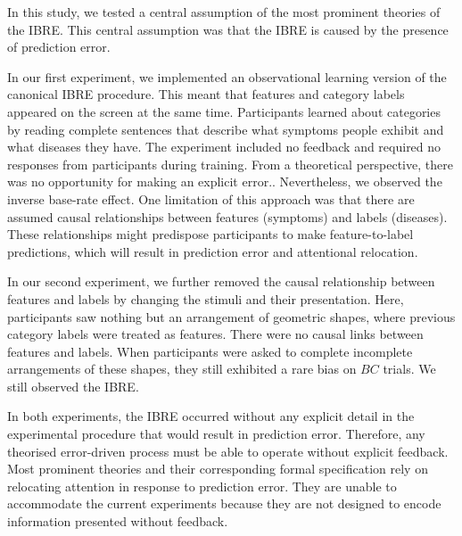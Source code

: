 \documentclass[10pt,letterpaper]{article}
\begin{document}
In this study, we tested a central assumption of the most prominent theories of the IBRE.
This central assumption was that the IBRE is caused by the presence of prediction error.

In our first experiment, we implemented an observational learning version of the canonical IBRE procedure.
This meant that features and category labels appeared on the screen at the same time.
Participants learned about categories by reading complete sentences that describe what symptoms people exhibit and what diseases they have.
The experiment included no feedback and required no responses from participants during training.
From a theoretical perspective, there was no opportunity for making an explicit error..
Nevertheless, we observed the inverse base-rate effect.
One limitation of this approach was that there are assumed causal relationships between features (symptoms) and labels (diseases).
These relationships might predispose participants to make feature-to-label predictions, which will result in prediction error and attentional relocation.

In our second experiment, we further removed the causal relationship between features and labels by changing the stimuli and their presentation.
Here, participants saw nothing but an arrangement of geometric shapes, where previous category labels were treated as features.
There were no causal links between features and labels.
When participants were asked to complete incomplete arrangements of these shapes, they still exhibited a rare bias on $BC$ trials.
We still observed the IBRE.

In both experiments, the IBRE occurred without any explicit detail in the experimental procedure that would result in prediction error.
Therefore, any theorised error-driven process must be able to operate without explicit feedback.
Most prominent theories and their corresponding formal specification rely on relocating attention in response to prediction error.
They are unable to accommodate the current experiments because they are not designed to encode information presented without feedback.

\end{document}
